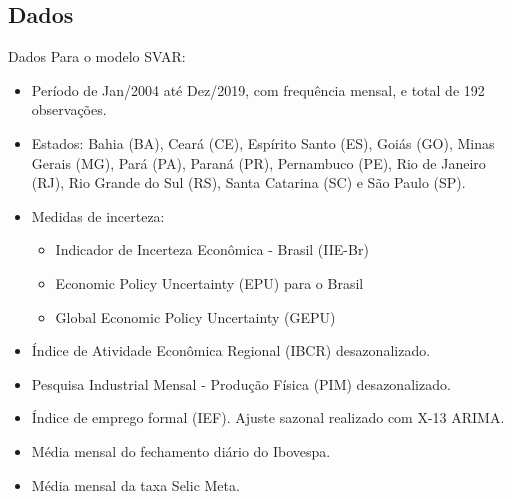 \documentclass[aspectratio=169, 10pt]{beamer}
\begin{document}
\subsection{Dados}
\begin{frame}{Dados}
Para o modelo SVAR:
\begin{itemize}
    \item Período de Jan/2004 até Dez/2019, com frequência mensal, e total de 192 observações.
    \item Estados: Bahia (BA), Ceará (CE), Espírito Santo (ES), Goiás (GO), Minas Gerais (MG), Pará (PA), Paraná (PR), Pernambuco (PE), Rio de Janeiro (RJ), Rio Grande do Sul (RS), Santa Catarina (SC) e São Paulo (SP). 
    \item Medidas de incerteza:
        \begin{itemize}
            \item Indicador de Incerteza Econômica - Brasil (IIE-Br)
            \item Economic Policy Uncertainty (EPU) para o Brasil
            \item Global Economic Policy Uncertainty (GEPU)
        \end{itemize}
    \item Índice de Atividade Econômica Regional (IBCR) desazonalizado.
    \item Pesquisa Industrial Mensal - Produção Física (PIM) desazonalizado.
    \item Índice de emprego formal (IEF). Ajuste sazonal realizado com X-13 ARIMA.
    \item Média mensal do fechamento diário do Ibovespa.
    \item Média mensal da taxa Selic Meta.
 \end{itemize}
\end{frame}
\end{document}
